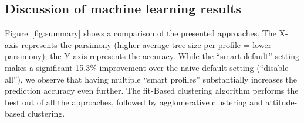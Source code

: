 

\subsection{Discussion of machine learning results}
Figure~\ref{fig:summary} shows a comparison of the presented approaches. The X-axis represents the parsimony (higher average tree size per profile = lower parsimony); the Y-axis represents the accuracy. While the ``smart default'' setting makes a significant 15.3\% improvement over the naive default setting (``disable all''), we observe that having multiple ``smart profiles'' substantially increases the prediction accuracy even further. The fit-Based clustering algorithm performs the best out of all the approaches, followed by agglomerative clustering and attitude-based clustering. 


